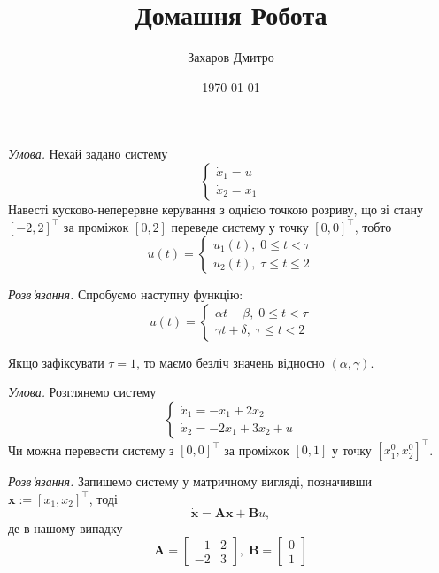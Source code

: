 \documentclass[oneside,solution]{karazin-control-assign}
\title{Домашня Робота}
\author{Захаров Дмитро}
\date{\today}
\begin{document}
\maketitle



\hspace{20px}\textit{Умова.} Нехай задано систему
\begin{equation*}
    \begin{cases}
        \dot{x}_1 = u \\
        \dot{x}_2 = x_1
    \end{cases}
\end{equation*}
Навесті кусково-неперервне керування з однією точкою розриву, що зі стану $[-2,2]^{\top}$ за проміжок $[0,2]$ переведе систему у точку $[0,0]^{\top}$, тобто
\begin{equation}
    u(t) = \begin{cases}
        u_1(t), \; 0 \leq t < \tau \\
        u_2(t), \; \tau \leq t \leq 2
    \end{cases}
\end{equation}

\textit{Розв'язання.} Спробуємо наступну функцію:
\begin{equation}
    u(t) = \begin{cases}
        \alpha t + \beta, \; 0 \leq t < \tau \\
        \gamma t + \delta, \; \tau \leq t < 2
    \end{cases}
\end{equation}

Якщо зафіксувати $\tau=1$, то маємо безліч значень відносно $(\alpha,\gamma)$. 


\hspace{20px}\textit{Умова.} Розглянемо систему
\begin{equation*}
    \begin{cases}
        \dot{x}_1 = -x_1+2x_2 \\
        \dot{x}_2 = -2x_1+3x_2+u
    \end{cases}
\end{equation*}
Чи можна перевести систему з $[0,0]^{\top}$ за проміжок $[0,1]$ у точку $[x_1^0,x_2^0]^{\top}$.

\textit{Розв'язання.} Запишемо систему у матричному вигляді, позначивши $\mathbf{x} := [x_1,x_2]^{\top}$, тоді
\begin{equation}
    \dot{\mathbf{x}} = \mathbf{A}\mathbf{x} + \mathbf{B}u,
\end{equation}
де в нашому випадку
\begin{equation}
    \mathbf{A} = \begin{bmatrix}
        -1 & 2 \\ -2 & 3
    \end{bmatrix}, \; \mathbf{B} = \begin{bmatrix}
        0 \\ 1
    \end{bmatrix}
\end{equation}
\end{document}
